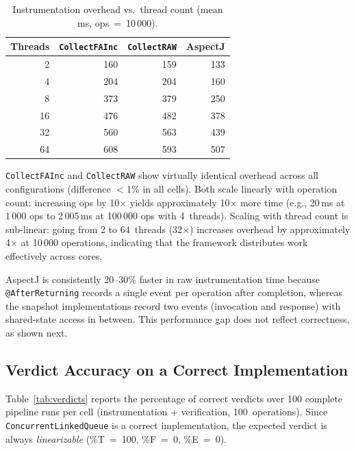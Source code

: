 \documentclass[preprint,12pt]{elsarticle}
\begin{document}
\begin{table}[h!]
\centering
\scriptsize
\caption{Instrumentation overhead vs.\ thread count (mean ms,
         ops~=~10\,000).}
\label{tab:threads}
\begin{tabular}{rrrr}
\hline
\textbf{Threads} & \texttt{CollectFAInc} & \texttt{CollectRAW} & AspectJ \\
\hline
  2 &   160 &   159 &   133 \\
  4 &   204 &   204 &   160 \\
  8 &   373 &   379 &   250 \\
 16 &   476 &   482 &   378 \\
 32 &   560 &   563 &   439 \\
 64 &   608 &   593 &   507 \\
\hline
\end{tabular}
\end{table}

\texttt{CollectFAInc} and \texttt{CollectRAW} show virtually identical
overhead across all configurations (difference $<$1\% in all cells).
Both scale linearly with operation count: increasing ops by 10$\times$
yields approximately 10$\times$ more time (e.g., 20\,ms at 1\,000 ops
to 2\,005\,ms at 100\,000 ops with 4~threads). Scaling with thread count
is sub-linear: going from 2 to 64~threads (32$\times$) increases overhead
by approximately 4$\times$ at 10\,000 operations, indicating that the
framework distributes work effectively across cores.

AspectJ is consistently 20--30\% faster in raw instrumentation time
because \texttt{@AfterReturning} records a single event per operation
after completion, whereas the snapshot implementations record two events
(invocation and response) with shared-state access in between.
This performance gap does not reflect correctness, as shown next.

\subsection{Verdict Accuracy on a Correct Implementation}

Table~\ref{tab:verdicts} reports the percentage of correct verdicts
over 100 complete pipeline runs per cell (instrumentation + verification,
100~operations). Since \texttt{ConcurrentLinkedQueue} is a correct
implementation, the expected verdict is always \emph{linearizable}
(\%T~=~100, \%F~=~0, \%E~=~0).
\end{document}
